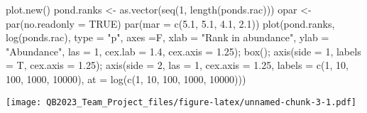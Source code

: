 \documentclass[
]{article}
\newenvironment{Shaded}{\begin{snugshade}}{\end{snugshade}}
\newcommand{\AttributeTok}[1]{\textcolor[rgb]{0.77,0.63,0.00}{#1}}
\newcommand{\ConstantTok}[1]{\textcolor[rgb]{0.00,0.00,0.00}{#1}}
\newcommand{\DecValTok}[1]{\textcolor[rgb]{0.00,0.00,0.81}{#1}}
\newcommand{\FloatTok}[1]{\textcolor[rgb]{0.00,0.00,0.81}{#1}}
\newcommand{\FunctionTok}[1]{\textcolor[rgb]{0.00,0.00,0.00}{#1}}
\newcommand{\NormalTok}[1]{#1}
\newcommand{\OtherTok}[1]{\textcolor[rgb]{0.56,0.35,0.01}{#1}}
\newcommand{\StringTok}[1]{\textcolor[rgb]{0.31,0.60,0.02}{#1}}
\begin{document}
\begin{Shaded}
\begin{Highlighting}[]
\FunctionTok{plot.new}\NormalTok{()}
\NormalTok{pond.ranks }\OtherTok{\textless{}{-}} \FunctionTok{as.vector}\NormalTok{(}\FunctionTok{seq}\NormalTok{(}\DecValTok{1}\NormalTok{, }\FunctionTok{length}\NormalTok{(ponds.rac)))}
\NormalTok{opar }\OtherTok{\textless{}{-}} \FunctionTok{par}\NormalTok{(}\AttributeTok{no.readonly =} \ConstantTok{TRUE}\NormalTok{)}
\FunctionTok{par}\NormalTok{(}\AttributeTok{mar =} \FunctionTok{c}\NormalTok{(}\FloatTok{5.1}\NormalTok{, }\FloatTok{5.1}\NormalTok{, }\FloatTok{4.1}\NormalTok{, }\FloatTok{2.1}\NormalTok{))}
\FunctionTok{plot}\NormalTok{(pond.ranks, }\FunctionTok{log}\NormalTok{(ponds.rac), }\AttributeTok{type =} \StringTok{"p"}\NormalTok{, }\AttributeTok{axes =}\NormalTok{F,}
     \AttributeTok{xlab =} \StringTok{"Rank in abundance"}\NormalTok{, }\AttributeTok{ylab =} \StringTok{"Abundance"}\NormalTok{, }
     \AttributeTok{las =} \DecValTok{1}\NormalTok{, }\AttributeTok{cex.lab =} \FloatTok{1.4}\NormalTok{, }\AttributeTok{cex.axis =} \FloatTok{1.25}\NormalTok{);}
\FunctionTok{box}\NormalTok{();}
\FunctionTok{axis}\NormalTok{(}\AttributeTok{side =} \DecValTok{1}\NormalTok{, }\AttributeTok{labels =}\NormalTok{ T, }\AttributeTok{cex.axis =} \FloatTok{1.25}\NormalTok{);}
\FunctionTok{axis}\NormalTok{(}\AttributeTok{side =} \DecValTok{2}\NormalTok{, }\AttributeTok{las =} \DecValTok{1}\NormalTok{, }\AttributeTok{cex.axis =} \FloatTok{1.25}\NormalTok{, }\AttributeTok{labels =} \FunctionTok{c}\NormalTok{(}\DecValTok{1}\NormalTok{, }\DecValTok{10}\NormalTok{, }\DecValTok{100}\NormalTok{, }\DecValTok{1000}\NormalTok{, }\DecValTok{10000}\NormalTok{), }\AttributeTok{at =} \FunctionTok{log}\NormalTok{(}\FunctionTok{c}\NormalTok{(}\DecValTok{1}\NormalTok{, }\DecValTok{10}\NormalTok{, }\DecValTok{100}\NormalTok{, }\DecValTok{1000}\NormalTok{, }\DecValTok{10000}\NormalTok{)))}
\end{Highlighting}
\end{Shaded}

\texttt{[image: QB2023\_Team\_Project\_files/figure-latex/unnamed-chunk-3-1.pdf]}
\end{document}
